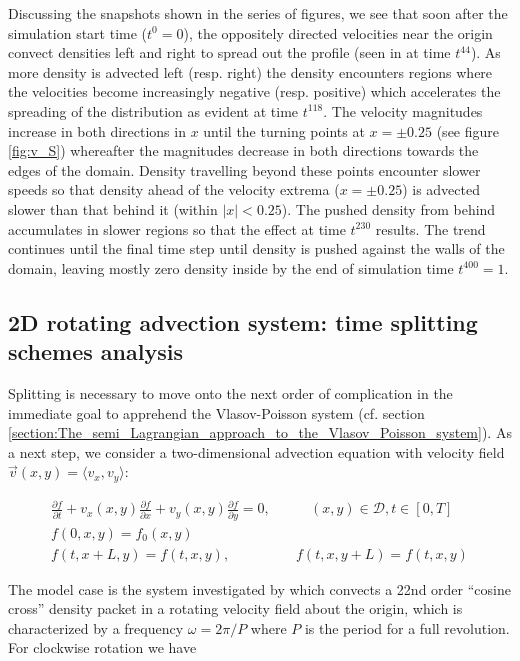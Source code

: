 \documentclass[11pt,titlepage]{report}
\begin{document}
Discussing the snapshots shown in the series of figures, we see that soon after the simulation start time ($t^0 = 0$), the oppositely directed velocities near the origin convect densities left and right to spread out the profile (seen in at time $t^{44}$). As more density is advected left (resp. right) the density encounters regions where the velocities become increasingly negative (resp. positive) which accelerates the spreading of the distribution as evident at time $t^{118}$. The velocity magnitudes increase in both directions in $x$ until the turning points at $x = \pm 0.25$ (see figure \ref{fig:v_S}) whereafter the magnitudes decrease in both directions towards the edges of the domain. Density travelling beyond these points encounter slower speeds so that density ahead of the velocity extrema ($x = \pm 0.25$) is advected slower than that behind it (within $|x| < 0.25$). The pushed density from behind accumulates in slower regions so that the effect at time $t^{230}$ results. The trend continues until the final time step until density is pushed against the walls of the domain, leaving mostly zero density inside by the end of simulation time $t^{400} = 1$.


\subsection{2D rotating advection system: time splitting schemes analysis}

\indent \indent Splitting is necessary to move onto the next order of complication in the immediate goal to apprehend the Vlasov-Poisson system (cf. section \ref{section:The_semi_Lagrangian_approach_to_the_Vlasov_Poisson_system}). As a next step, we consider a two-dimensional advection equation with velocity field $\vec{v}(x,y) = \langle v_x,v_y \rangle$:

\begin{subequations}
\label{eq:Advec_eq_1D_unit_vel}
\begin{align}
\frac{\partial f}{\partial t} + v_x(x,y)\frac{\partial f}{\partial x} + v_y(x,y)\frac{\partial f}{\partial y} =  0, &\qquad (x,y)\in\mathcal{D}, t\in [0,T] \label{eq:2D_advec_equation_general}\\[1em]
f(0,x,y) = f_0(x,y) \\[1em]
f(t,x + L,y) = f(t,x,y), & \quad f(t,x,y+L) = f(t,x,y)
\end{align}
\end{subequations}

The model case is the system investigated by \cite{Guclu14} which convects a 22nd order ``cosine cross'' density packet in a rotating velocity field about the origin, which is characterized by a frequency $\omega = 2\pi / P$ where $P$ is the period for a full revolution. For clockwise rotation we have
\end{document}
